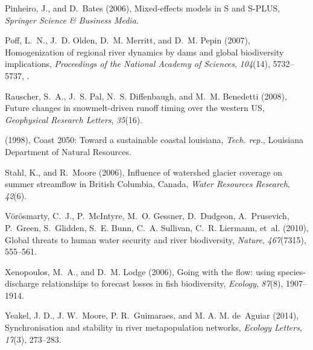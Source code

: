 \documentclass[9pt,twocolumn,twoside,lineno]{pnas-new}
\begin{document}
{{
Pinheiro, J., and D.~Bates (2006), Mixed-effects models in {S} and {S-PLUS},
  \textit{Springer Science \& Business Media}.

Poff, L.~N., J.~D. Olden, D.~M. Merritt, and D.~M. Pepin (2007), Homogenization
  of regional river dynamics by dams and global biodiversity implications,
  \textit{Proceedings of the National Academy of Sciences}, \textit{104}(14),
  5732--5737, .

Rauscher, S.~A., J.~S. Pal, N.~S. Diffenbaugh, and M.~M. Benedetti (2008),
  Future changes in snowmelt-driven runoff timing over the western {US},
  \textit{Geophysical Research Letters}, \textit{35}(16).

 (1998), Coast 2050:
  {T}oward a sustainable coastal louisiana, \textit{Tech. rep.}, Louisiana
  Department of Natural Resources.

Stahl, K., and R.~Moore (2006), Influence of watershed glacier coverage on
  summer streamflow in {B}ritish {C}olumbia, {C}anada, \textit{Water Resources
  Research}, \textit{42}(6).

V{\"o}r{\"o}smarty, C.~J., P.~McIntyre, M.~O. Gessner, D.~Dudgeon,
  A.~Prusevich, P.~Green, S.~Glidden, S.~E. Bunn, C.~A. Sullivan, C.~R.
  Liermann, et~al. (2010), Global threats to human water security and river
  biodiversity, \textit{Nature}, \textit{467}(7315), 555--561.

Xenopoulos, M.~A., and D.~M. Lodge (2006), Going with the flow: using
  species-discharge relationships to forecast losses in fish biodiversity,
  \textit{Ecology}, \textit{87}(8), 1907--1914.

Yeakel, J. D., J. W.~Moore, P. R.~Guimaraes, and M. A. M. de~Aguiar (2014), Synchronisation and
  stability in river metapopulation networks, \textit{Ecology Letters},
  \textit{17}(3), 273--283.

}}
\end{document}
